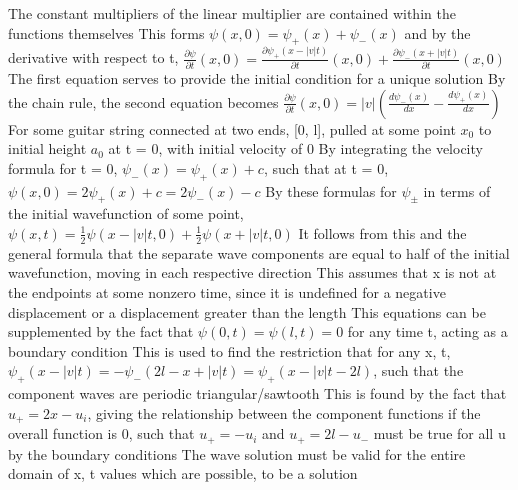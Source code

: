 \documentclass[11 pt, twoside]{article}
\newenvironment{outline*}
{
	\begin{outline}[enumerate]
	}
	{\end{outline}
}
\begin{document}
\begin{outline*}
\3 The constant multipliers of the linear multiplier are contained within the functions themselves
\3 This forms $\psi(x, 0) = \psi_+(x) + \psi_-(x)$ and by the derivative with respect to t, $\frac{\partial \psi}{\partial t}(x, 0) = \frac{\partial \psi_+ (x - |v|t)}{\partial t}(x, 0) + \frac{\partial \psi_- (x + |v|t)}{\partial t}(x, 0)$
\4 The first equation serves to provide the initial condition for a unique solution
\3 By the chain rule, the second equation becomes $\frac{\partial \psi}{\partial t}(x, 0) = |v|(\frac{d\psi_-(x)}{dx} - \frac{d\psi_+(x)}{dx})$
\2 For some guitar string connected at two ends, [0, l], pulled at some point $x_0$ to initial height $a_0$ at t = 0, with initial velocity of 0
\3 By integrating the velocity formula for t = 0, $\psi_-(x) = \psi_+(x) + c$, such that at t = 0, $\psi(x, 0) = 2\psi_+(x) + c = 2\psi_-(x) - c$
\1 By these formulas for $\psi_\pm$ in terms of the initial wavefunction of some point, $\psi(x, t) = \frac{1}{2}\psi(x - |v|t, 0) + \frac{1}{2}\psi(x + |v|t, 0)$
\2 It follows from this and the general formula that the separate wave components are equal to half of the initial wavefunction, moving in each respective direction
\2 This assumes that x is not at the endpoints at some nonzero time, since it is undefined for a negative displacement or a displacement greater than the length
\2 This equations can be supplemented by the fact that $\psi(0, t) = \psi(l, t) = 0$ for any time t, acting as a boundary condition
\2 This is used to find the restriction that for any x, t, $\psi_+(x - |v|t) = -\psi_-(2l - x + |v|t) = \psi_+(x - |v|t - 2l)$, such that the component waves are periodic triangular/sawtooth
\3 This is found by the fact that $u_+ = 2x - u_i$, giving the relationship between the component functions if the overall function is 0, such that $u_+ = -u_i$ and $u_+ = 2l - u_-$ must be true for all u by the boundary conditions
\1 The wave solution must be valid for the entire domain of x, t values which are possible, to be a solution
\end{outline*}
\end{document}
